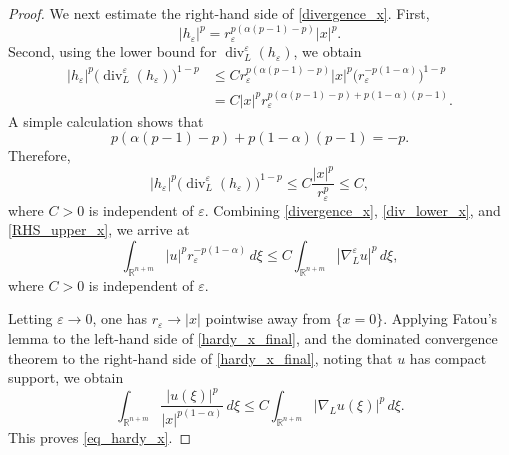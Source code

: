 \documentclass[12pt]{amsart}
\begin{document}
\begin{proof}
We next estimate the right-hand side of \eqref{divergence_x}. First,
\[
    |h_\varepsilon|^p
    =
    r_\varepsilon^{p(\alpha(p-1)-p)}|x|^p.
\]
Second, using the lower bound for $\operatorname{div}_L^\varepsilon(h_\varepsilon)$, we obtain
\begin{align*}
    |h_\varepsilon|^p
    \bigl(
        \operatorname{div}_L^\varepsilon(h_\varepsilon)
    \bigr)^{1-p}
    &\leq
    C
    r_\varepsilon^{p(\alpha(p-1)-p)}
    |x|^p
    \bigl(
        r_\varepsilon^{-p(1-\alpha)}
    \bigr)^{1-p}                                      \\
    &=
    C
    |x|^p
    r_\varepsilon^{p(\alpha(p-1)-p)+p(1-\alpha)(p-1)}.
\end{align*}
A simple calculation shows that
\[
    p(\alpha(p-1)-p)+p(1-\alpha)(p-1)= -p.
\]
Therefore,
\begin{equation}\label{RHS_upper_x}
    |h_\varepsilon|^p
    \bigl(
        \operatorname{div}_L^\varepsilon(h_\varepsilon)
    \bigr)^{1-p}
    \leq
    C\frac{|x|^p}{r_\varepsilon^p}
    \leq C,
\end{equation}
where $C>0$ is independent of $\varepsilon$. Combining \eqref{divergence_x}, \eqref{div_lower_x}, and \eqref{RHS_upper_x}, we arrive at
\begin{equation}\label{hardy_x_final}
    \int_{\mathbb R^{n+m}}
    |u|^p r_\varepsilon^{-p(1-\alpha)}\,d\xi
    \leq
    C
    \int_{\mathbb R^{n+m}}
    |\nabla_L^\varepsilon u|^p \, d\xi,
\end{equation}
where $C>0$ is independent of $\varepsilon$.

Letting $\varepsilon\to0$, one has $r_\varepsilon\to |x|$ pointwise away from $\{x=0\}$. Applying Fatou's lemma to the left-hand side of
\eqref{hardy_x_final}, and the dominated convergence theorem to the right-hand side of
\eqref{hardy_x_final}, noting that $u$ has compact support, we obtain
\[
    \int_{\mathbb R^{n+m}}
    \frac{|u(\xi)|^p}{|x|^{p(1-\alpha)}}\,d\xi
    \leq
    C
    \int_{\mathbb R^{n+m}}
    |\nabla_L u(\xi)|^p \, d\xi.
\]
This proves \eqref{eq_hardy_x}.
\end{proof}
\end{document}
